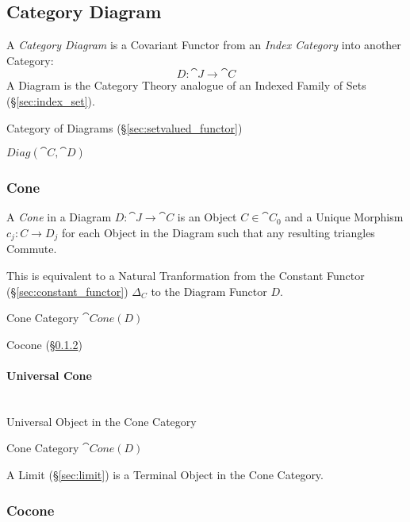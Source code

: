 \subsection{Category Diagram}\label{sec:category_diagram}

A \emph{Category Diagram} is a Covariant Functor from an \emph{Index
  Category} into another Category:
\[
  D : \cat{J} \rightarrow \cat{C}
\]
A Diagram is the Category Theory analogue of an Indexed Family of Sets
(\S\ref{sec:index_set}).

Category of Diagrams (\S\ref{sec:setvalued_functor})

$Diag(\cat{C},\cat{D})$



\subsubsection{Cone}\label{sec:category_cone}

A \emph{Cone} in a Diagram $D : \cat{J} \rightarrow \cat{C}$ is
an Object $C \in \cat{C}_0$ and a Unique Morphism $c_j : C
\rightarrow D_j$ for each Object in the Diagram such that any
resulting triangles Commute.

This is equivalent to a Natural Tranformation from the Constant
Functor (\S\ref{sec:constant_functor}) $\Delta_C$ to the Diagram
Functor $D$.

Cone Category $\cat{Cone}(D)$

Cocone (\S\ref{sec:cocone})



\paragraph{Universal Cone}\label{sec:universal_cone}
\hfill \\

Universal Object in the Cone Category

Cone Category $\cat{Cone}(D)$

A Limit (\S\ref{sec:limit}) is a Terminal Object in the Cone
Category.



\subsubsection{Cocone}\label{sec:cocone}

